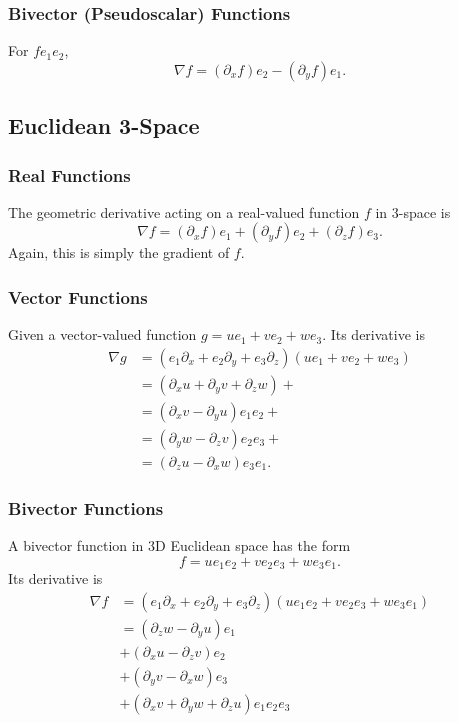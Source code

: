 	\subsubsection{Bivector (Pseudoscalar) Functions}
	
	For $fe_1e_2$,
	\[
	\nabla f = \left(\partial_x f\right) e_2 - \left(\partial_y f\right) e_1.
	\]	
	\subsection{Euclidean 3-Space}
	
	\subsubsection{Real Functions}
	
	The geometric derivative acting on a real-valued function $f$ in 3-space is
	\[
	\nabla f = \left( \partial_x f\right) e_1  + \left( \partial_y f\right) e_2 + \left( \partial_z f\right) e_3.
	\]
	Again, this is simply the gradient of $f$.
	
	\subsubsection{Vector Functions}
	
	Given a vector-valued function $g = u e_1 + ve_2 + we_3.$ Its derivative is	
	\begin{align*}
	\nabla g & = \left(e_1\partial_x + e_2\partial_y + e_3\partial_z\right) \left(ue_1 + ve_2 + we_3\right) \\
	& = \left( \partial_x u + \partial_y v + \partial_z w\right) + \\
	& = \left( \partial_x v - \partial_y u\right)e_1e_2 + \\
	& = \left( \partial_y w - \partial_z v\right)e_2e_3 + \\
	& = \left( \partial_z u - \partial_x w\right)e_3e_1.
	\end{align*}	
	\subsubsection{Bivector Functions}
	A bivector function in 3D Euclidean space has the form
	\[
	f = ue_1e_2 + ve_2e_3 + we_3e_1.
	\]	
	Its derivative is	
	\begin{align*}
	\nabla f &= \left(e_1\partial_x + e_2\partial_y + e_3\partial_z\right) \left(ue_1e_2 + ve_2e_3 + we_3e_1\right) \\
	&= \left(\partial_zw - \partial_yu\right)e_1 \\
	&+ \left(\partial_xu - \partial_zv\right)e_2\\
	&+ \left(\partial_yv - \partial_xw\right)e_3\\
	&+ \left(\partial_xv + \partial_yw + \partial_zu\right)e_1e_2e_3\\
	\end{align*}
